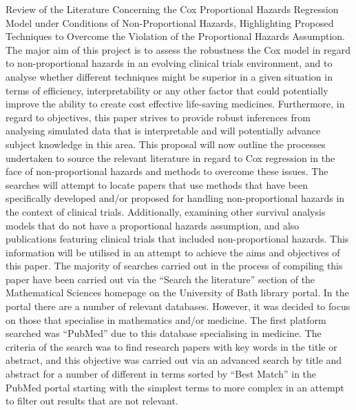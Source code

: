 \documentclass[12pt,twoside]{reedthesis}
\begin{document}
Review of the Literature Concerning the Cox Proportional Hazards Regression Model under Conditions of Non-Proportional Hazards, Highlighting Proposed Techniques to Overcome the Violation of the Proportional Hazards Assumption.
The major aim of this project is to assess the robustness the Cox model in regard to non-proportional hazards in an evolving clinical trials environment, and to analyse whether different techniques might be superior in a given situation in terms of efficiency, interpretability or any other factor that could potentially improve the ability to create cost effective life-saving medicines. Furthermore, in regard to objectives, this paper strives to provide robust inferences from analysing simulated data that is interpretable and will potentially advance subject knowledge in this area.
This proposal will now outline the processes undertaken to source the relevant literature in regard to Cox regression in the face of non-proportional hazards and methods to overcome these issues. The searches will attempt to locate papers that use methods that have been specifically developed and/or proposed for handling non-proportional hazards in the context of clinical trials. Additionally, examining other survival analysis models that do not have a proportional hazards assumption, and also publications featuring clinical trials that included non-proportional hazards. This information will be utilised in an attempt to achieve the aims and objectives of this paper.
The majority of searches carried out in the process of compiling this paper have been carried out via the ``Search the literature'' section of the Mathematical Sciences homepage on the University of Bath library portal. In the portal there are a number of relevant databases. However, it was decided to focus on those that specialise in mathematics and/or medicine.
The first platform searched was ``PubMed'' due to this database specialising in medicine. The criteria of the search was to find research papers with key words in the title or abstract, and this objective was carried out via an advanced search by title and abstract for a number of different in terms sorted by ``Best Match'' in the PubMed portal starting with the simplest terms to more complex in an attempt to filter out results that are not relevant.
\end{document}
